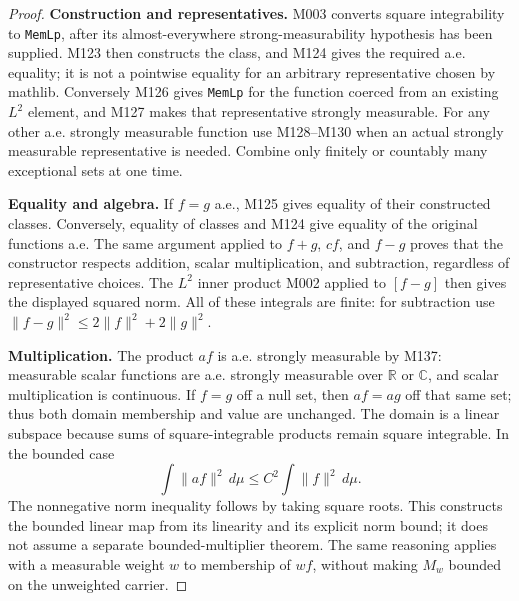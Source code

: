 \documentclass[11pt,a4paper]{article}
\theoremstyle{definition}
\theoremstyle{remark}
\begin{document}
\begin{proof}
\textbf{Construction and representatives.}
M003 converts square integrability to \nolinkurl{MemLp}, after its
almost-everywhere strong-measurability hypothesis has been supplied.
M123 then constructs the class, and M124 gives the required a.e. equality;
it is not a pointwise equality for an arbitrary representative chosen by
mathlib. Conversely M126 gives \nolinkurl{MemLp} for the function coerced
from an existing $L^2$ element, and M127 makes that representative strongly
measurable. For any other a.e. strongly measurable function use M128--M130
when an actual strongly measurable representative is needed. Combine
only finitely or countably many exceptional sets at one time.

\textbf{Equality and algebra.}
If $f=g$ a.e., M125 gives equality of their constructed classes.
Conversely, equality of classes and M124 give equality of the original
functions a.e. The same argument applied to $f+g$, $cf$, and $f-g$
proves that the constructor respects addition, scalar multiplication,
and subtraction, regardless of representative choices. The $L^2$ inner
product M002 applied to $[f-g]$ then gives the displayed squared norm.
All of these integrals are finite: for subtraction use
$\|f-g\|^2\leq2\|f\|^2+2\|g\|^2$.

\textbf{Multiplication.}
The product $af$ is a.e. strongly measurable by M137: measurable scalar
functions are a.e. strongly measurable over $\mathbb R$ or $\mathbb C$,
and scalar multiplication is continuous. If $f=g$ off a null set,
then $af=ag$ off that same set; thus both domain membership and value
are unchanged. The domain is a linear subspace because sums of
square-integrable products remain square integrable. In the bounded case
\[
 \int\|af\|^2\,d\mu\leq C^2\int\|f\|^2\,d\mu.
\]
The nonnegative norm inequality follows by taking square roots. This
constructs the bounded linear map from its linearity and its explicit
norm bound; it does not assume a separate bounded-multiplier theorem.
The same reasoning applies with a measurable weight $w$ to membership
of $wf$, without making $M_w$ bounded on the unweighted carrier.
\end{proof}
\end{document}
